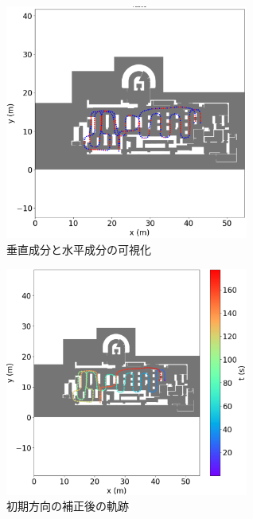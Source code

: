 \documentclass[Japanese]{dicomopapers}
\begin{document}
\begin{figure}[h]
	\centering
	\includegraphics[width=80mm]{image/rb.png}
	\caption{垂直成分と水平成分の可視化}    \label{fig:color}
\end{figure}

\begin{figure}[h]
	\centering
	\includegraphics[width=80mm]{image/pdr-rotate.jpg}
	\caption{初期方向の補正後の軌跡}    \label{}
\end{figure}





\end{document}
